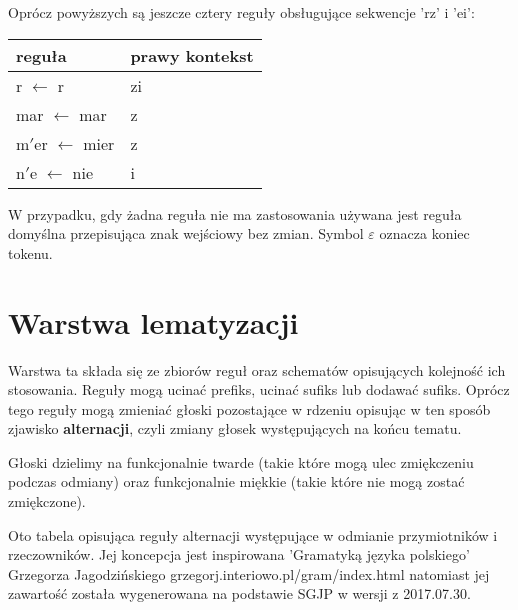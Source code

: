 \documentclass{article}
\begin{document}
Oprócz powyższych są jeszcze cztery reguły obsługujące sekwencje 'rz' i 'ei':
\begin{center}
\begin{tabular}{l|l}
reguła & prawy kontekst \\
\hline
r	 $\leftarrow$ r	& zi \\
mar	 $\leftarrow$ mar	& z\\
m$'$er	 $\leftarrow$ mier	& z\\
n$'$e	 $\leftarrow$ nie	& i\\
\end{tabular}
\end{center}


W przypadku, gdy żadna reguła nie ma zastosowania używana jest reguła domyślna przepisująca znak wejściowy bez zmian.
Symbol $\varepsilon$ oznacza koniec tokenu.

\section{Warstwa lematyzacji}

Warstwa ta składa się ze zbiorów reguł oraz schematów opisujących kolejność ich stosowania.
Reguły mogą ucinać prefiks, ucinać sufiks lub dodawać sufiks.
Oprócz tego reguły mogą zmieniać głoski pozostające w rdzeniu opisując w ten sposób zjawisko \textbf{alternacji},
czyli zmiany głosek występujących na końcu tematu.

Głoski dzielimy na funkcjonalnie twarde (takie które mogą ulec zmiękczeniu podczas odmiany) oraz funkcjonalnie miękkie
(takie które nie mogą zostać zmiękczone).

Oto tabela opisująca reguły alternacji występujące w odmianie przymiotników i rzeczowników. Jej koncepcja jest inspirowana
'Gramatyką języka polskiego' Grzegorza Jagodzińskiego grzegorj.interiowo.pl/gram/index.html
natomiast jej zawartość została wygenerowana na podstawie SGJP w wersji z 2017.07.30.
\end{document}
